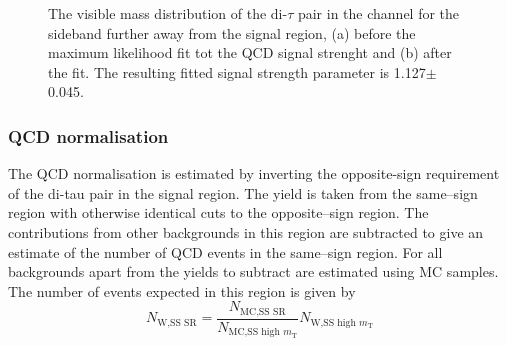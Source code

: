 \begin{figure}[h!]
\begin{center}
\end{center}
\caption{The visible mass distribution of the di-$\tau$ pair in the \etau channel for the sideband further away from the signal region, (a) before
the maximum likelihood fit tot the QCD signal strenght and (b) after the fit. The resulting fitted signal strength parameter
is 1.127$\pm$0.045.}
\label{fig:mssm_qcdosss_etfar}
\end{figure}




\subsubsection{QCD normalisation}
\label{sec:mssm_bkgs_etmt_qcdnorm}
The QCD normalisation is estimated by inverting the opposite-sign requirement
of the di-tau pair in the signal region. The yield is taken from the same--sign
region with otherwise identical cuts to the opposite--sign region. The contributions
from other backgrounds in this region are subtracted to give an estimate of the number
of QCD events in the same--sign region. For all backgrounds apart from \Wjets the
yields to subtract are estimated using \ac{MC} samples. The number of \Wjets events
expected in this region is given by
\begin{equation}\label{eqn:wjets_qcdsub}
N_{\text{W,SS SR}} = \frac{N_{\text{MC,SS SR}}}{N_{\text{MC,SS high }m_{\text{T}}}}N_{\text{W,SS high }m_{\text{T}}}
\end{equation}

